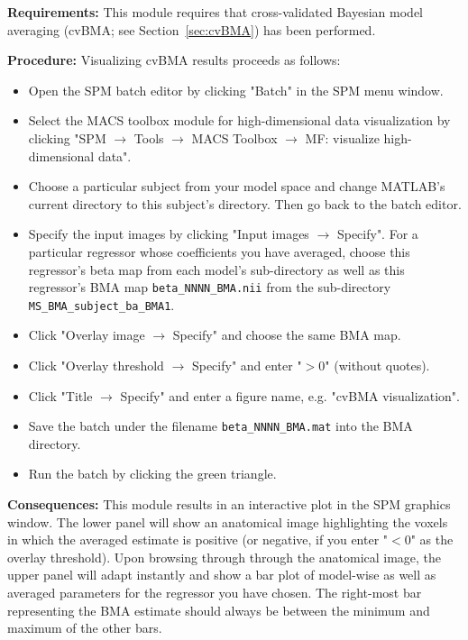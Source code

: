 \documentclass[a4paper,12pt]{article}
\newcommand{\ra}{$\rightarrow$ }
\begin{document}
\textbf{Requirements:} This module requires that cross-validated Bayesian model averaging (cvBMA; see Section~\ref{sec:cvBMA}) has been performed.

\textbf{Procedure:} Visualizing cvBMA results proceeds as follows:
\begin{itemize}
	
\item
Open the SPM batch editor by clicking "Batch" in the SPM menu window.

\item
Select the MACS toolbox module for high-dimensional data visualization by clicking "SPM \ra Tools \ra MACS Toolbox \ra MF: visualize high-dimensional data".

\item
Choose a particular subject from your model space and change MATLAB's current directory to this subject's directory. Then go back to the batch editor.

\item
Specify the input images by clicking "Input images \ra Specify". For a particular regressor whose coefficients you have averaged, choose this regressor's beta map from each model's sub-directory as well as this regressor's BMA map \texttt{beta\_NNNN\_BMA.nii} from the sub-directory \texttt{MS\_BMA\_subject\_ba\_BMA1}.

\item
Click "Overlay image \ra Specify" and choose the same BMA map.

\item
Click "Overlay threshold \ra Specify" and enter "$>\!0$" (without quotes).

\item
Click "Title \ra Specify" and enter a figure name, e.g. "cvBMA visualization".

\item
Save the batch under the filename \texttt{beta\_NNNN\_BMA.mat} into the BMA directory.

\item
Run the batch by clicking the green triangle.
	
\end{itemize}

\textbf{Consequences:} This module results in an interactive plot in the SPM graphics window. The lower panel will show an anatomical image highlighting the voxels in which the averaged estimate is positive (or negative, if you enter "$<0$" as the overlay threshold). Upon browsing through through the anatomical image, the upper panel will adapt instantly and show a bar plot of model-wise as well as averaged parameters for the regressor you have chosen. The right-most bar representing the BMA estimate should always be between the minimum and maximum of the other bars.
\end{document}

